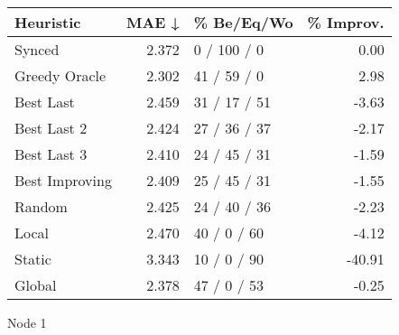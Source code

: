 \begin{tabular}{lrlr}
\toprule
\textbf{Heuristic} & \textbf{MAE ↓} & \textbf{\% Be/Eq/Wo} & \textbf{\% Improv.} \\
\midrule
            Synced &          2.372 &          0 / 100 / 0 &                0.00 \\
     Greedy Oracle &          2.302 &          41 / 59 / 0 &                2.98 \\
         Best Last &          2.459 &         31 / 17 / 51 &               -3.63 \\
       Best Last 2 &          2.424 &         27 / 36 / 37 &               -2.17 \\
       Best Last 3 &          2.410 &         24 / 45 / 31 &               -1.59 \\
    Best Improving &          2.409 &         25 / 45 / 31 &               -1.55 \\
            Random &          2.425 &         24 / 40 / 36 &               -2.23 \\
             Local &          2.470 &          40 / 0 / 60 &               -4.12 \\
            Static &          3.343 &          10 / 0 / 90 &              -40.91 \\
            Global &          2.378 &          47 / 0 / 53 &               -0.25 \\
\bottomrule
\end{tabular}
\caption{Node 1}
\label{tab:hr_non_lr05_le1_bs2_1}
